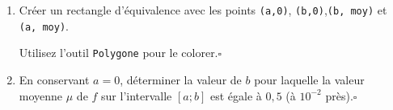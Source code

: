 \documentclass[a4paper,10pt]{report}
\begin{document}
\begin{enumerate}
{La valeur moyenne de la fonction $f$ sur l'intervalle $[0,1 ; 6]$ est d'environ $0,21$ volts.
        }
    \item Créer un rectangle d'équivalence avec les points \verb|(a,0)|, \verb|(b,0)|,\verb|(b, moy)| et \verb|(a, moy)|. 
    
    Utilisez l'outil \verb|Polygone| pour le colorer.\hfill $\square$

    \item En conservant $a=0$, déterminer la valeur de $b$ pour laquelle la valeur moyenne $\mu$ de $f$ sur l'intervalle $[a ; b]$ est égale à $0,5$  (à $10^{-2}$ près).\hfill $\square$
\end{enumerate}

         
\end{document}
